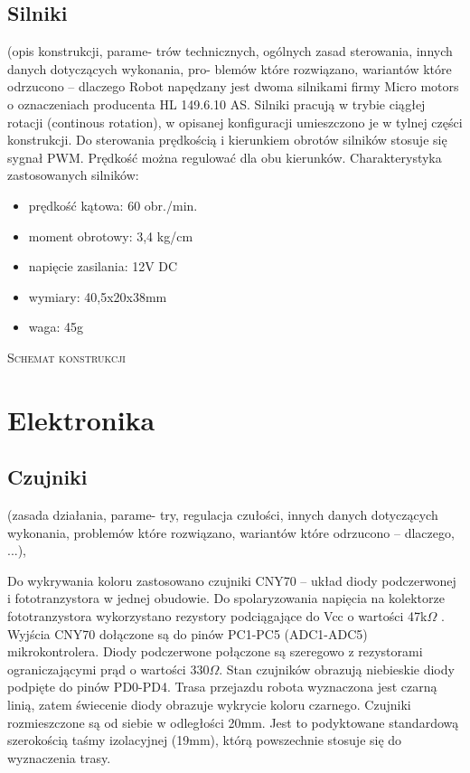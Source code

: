 \documentclass[11pt,a4paper]{article}
\begin{document}
\subsection{Silniki}
(opis konstrukcji, parame-
trów technicznych, ogólnych zasad sterowania, innych danych dotyczących wykonania, pro-
blemów które rozwiązano, wariantów które odrzucono – dlaczego
Robot napędzany jest dwoma silnikami firmy Micro motors o oznaczeniach producenta HL 149.6.10 AS.
  Silniki pracują w trybie ciągłej rotacji (continous rotation), w opisanej konfiguracji umieszczono je w tylnej części konstrukcji. 
  Do sterowania prędkością i kierunkiem obrotów silników stosuje się sygnał PWM. Prędkość można regulować dla obu kierunków.
  Charakterystyka zastosowanych silników:
  \begin{itemize}
    \item prędkość kątowa: 60 obr./min.
    \item moment obrotowy: 3,4 kg/cm
    \item napięcie zasilania: 12V DC
    \item wymiary: 40,5x20x38mm
    \item waga: 45g
  \end{itemize}
 
  \textsc{Schemat konstrukcji}

\section{Elektronika}

\subsection{Czujniki}
(zasada działania, parame-
try, regulacja czułości, innych danych dotyczących wykonania, problemów które rozwiązano,
wariantów które odrzucono – dlaczego, ...),

Do wykrywania koloru zastosowano czujniki CNY70 – układ diody podczerwonej i fototranzystora w jednej obudowie. Do spolaryzowania napięcia na kolektorze fototranzystora wykorzystano rezystory podciągające do Vcc o wartości 47k$\Omega$ . Wyjścia CNY70 dołączone są do pinów PC1-PC5 (ADC1-ADC5) mikrokontrolera.
  Diody podczerwone połączone są szeregowo z rezystorami ograniczającymi prąd o wartości 330$\Omega$.
  Stan czujników obrazują niebieskie diody podpięte do pinów PD0-PD4. 
  Trasa przejazdu robota wyznaczona jest czarną linią, zatem świecenie diody obrazuje wykrycie koloru czarnego.
  Czujniki rozmieszczone są od siebie w odległości 20mm. Jest to podyktowane standardową szerokością taśmy izolacyjnej (19mm), którą powszechnie stosuje się do wyznaczenia trasy.
  
\end{document}
